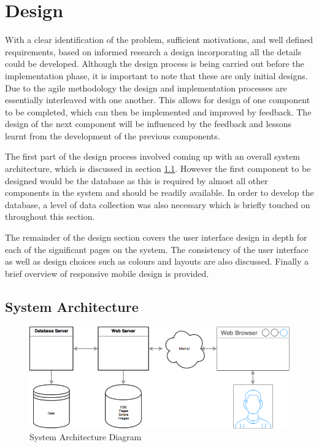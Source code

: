 \section{Design}
With a clear identification of the problem, sufficient motivations, and well defined requirements, based on informed research a design incorporating all the details could be developed. Although the design process is being carried out before the implementation phase, it is important to note that these are only initial designs. Due to the agile methodology the design and implementation processes are essentially interleaved with one another. This allows for design of one component to be completed, which can then be implemented and improved by feedback. The design of the next component will be influenced by the feedback and lessons learnt from the development of the previous components.

The first part of the design process involved coming up with an overall system architecture, which is discussed in section \ref{Section:System_Architecture}. However the first component to be designed would be the database as this is required by almost all other components in the system and should be readily available. In order to develop the database, a level of data collection was also necessary which is briefly touched on throughout this section.

The remainder of the design section covers the user interface design in depth for each of the significant pages on the system. The consistency of the user interface as well as design choices such as colours and layouts are also discussed. Finally a brief overview of responsive mobile design is provided.

\subsection{System Architecture} \label{Section:System_Architecture}

\begin{figure}[H]
	\centering
	\includegraphics[width=1.0\textwidth]{images/System_Architecture}
	\caption{System Architecture Diagram} \label{fig:System_Architecture}
\end{figure}

